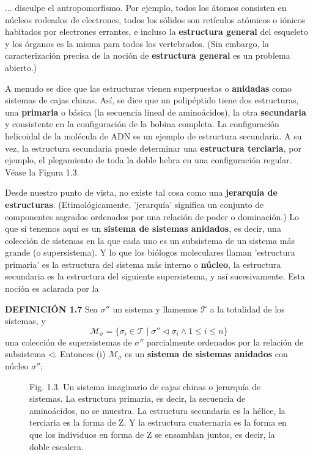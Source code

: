 {\fontsize{13}{15}\selectfont
... disculpe el antropomorfismo. Por ejemplo, todos los átomos consisten en núcleos rodeados de electrones, todos los sólidos son retículos atómicos o iónicos habitados por electrones errantes, e incluso la \textbf{estructura general} del esqueleto y los órganos es la misma para todos los vertebrados. (Sin embargo, la caracterización precisa de la noción de \textbf{estructura general} es un problema abierto.)

A menudo se dice que las estructuras vienen superpuestas o \textbf{anidadas} como sistemas de cajas chinas. Así, se dice que un polipéptido tiene dos estructuras, una \textbf{primaria} o básica (la secuencia lineal de aminoácidos), la otra \textbf{secundaria} y consistente en la configuración de la bobina completa. La configuración helicoidal de la molécula de ADN es un ejemplo de estructura secundaria. A su vez, la estructura secundaria puede determinar una \textbf{estructura terciaria}, por ejemplo, el plegamiento de toda la doble hebra en una configuración regular. Véase la Figura 1.3.

Desde nuestro punto de vista, no existe tal cosa como una \textbf{jerarquía de estructuras}. (Etimológicamente, 'jerarquía' significa un conjunto de componentes sagrados ordenados por una relación de poder o dominación.) Lo que sí tenemos aquí es un \textbf{sistema de sistemas anidados}, es decir, una colección de sistemas en la que cada uno es un subsistema de un sistema más grande (o supersistema). Y lo que los biólogos moleculares llaman 'estructura primaria' es la estructura del sistema más interno o \textbf{núcleo}, la estructura secundaria es la estructura del siguiente supersistema, y así sucesivamente. Esta noción es aclarada por la

\textbf{DEFINICIÓN 1.7} Sea $\sigma''$ un sistema y llamemos $\mathcal{T}$ a la totalidad de los sistemas, y
$$ \mathcal{M}_{\sigma} = \{\sigma_i \in \mathcal{T} \mid \sigma'' \triangleleft \sigma_i \land 1 \le i \le n\} $$
una colección de supersistemas de $\sigma''$ parcialmente ordenados por la relación de subsistema $\triangleleft$. Entonces
(i) $\mathcal{M}_{\sigma}$ es un \textbf{sistema de sistemas anidados} con núcleo $\sigma''$;

\begin{figure}[h!]
    \centering
    \caption*{Fig. 1.3. Un sistema imaginario de cajas chinas o jerarquía de sistemas. La estructura primaria, es decir, la secuencia de aminoácidos, no se muestra. La estructura secundaria es la hélice, la terciaria es la forma de Z. Y la estructura cuaternaria es la forma en que los individuos en forma de Z se ensamblan juntos, es decir, la doble escalera.}
\end{figure}
}

